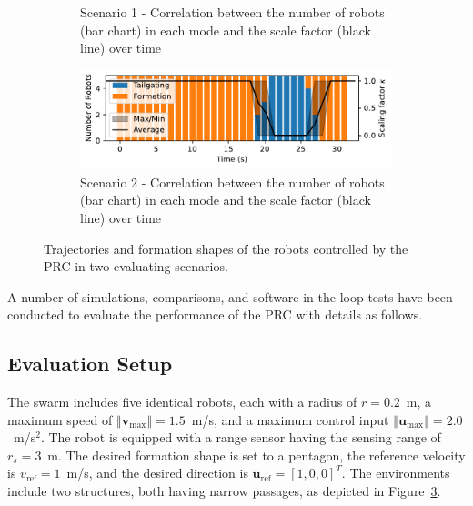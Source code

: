 \begin{figure}
\begin{subfigure}[b]{0.495\textwidth}
    \caption{Scenario 1 - Correlation between the number of  robots (bar chart) in each mode and the scale factor (black line) over time}
    \label{fig:cor1}
    \end{subfigure}
    \begin{subfigure}[b]{0.495\textwidth}
    \includegraphics[width=\textwidth]{paper3/images/correlation_scen2.pdf}
    \caption{Scenario 2 - Correlation between the number of  robots (bar chart) in each mode and the scale factor (black line) over time}
    \label{fig:cor2}
    \end{subfigure}
    \caption{Trajectories and formation shapes of the robots controlled by the PRC in two evaluating scenarios.}
    \label{fig:path}
\end{figure}

A number of simulations, comparisons, and software-in-the-loop tests have been conducted to evaluate the performance of the PRC with details as follows.

\subsection{Evaluation Setup}
The swarm includes five identical robots, each with a radius of $r=0.2$~m, a maximum speed of $\left\Vert \mathbf{v}_\text{max}\right\Vert=1.5$~m/s, and a maximum control input $\left\Vert \mathbf{u}_\text{max}\right\Vert=2.0$~m/s$^2$. The robot is equipped with a range sensor having the sensing range of $r_s=3$~m. The desired formation shape is set to a pentagon, the reference velocity is $\bar{v}_\text{ref}=1$~m/s, and the desired direction is $\mathbf{u}_\text{ref}=[1,0,0]^T$. The environments include two structures, both having narrow passages, as depicted in Figure~\ref{fig:path}.

